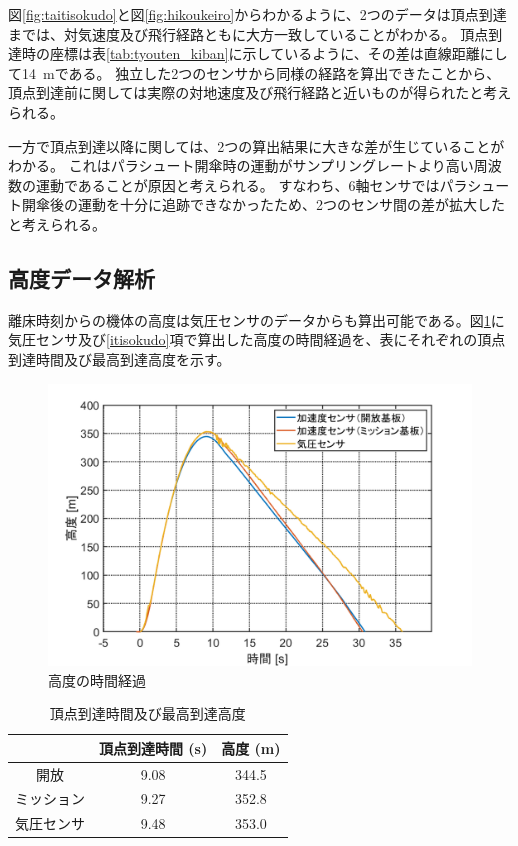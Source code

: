 \documentclass[a4paper,11pt,uplatex]{jsarticle}
\begin{document}
図\ref{fig:taitisokudo}と図\ref{fig:hikoukeiro}からわかるように、2つのデータは頂点到達までは、対気速度及び飛行経路ともに大方一致していることがわかる。
頂点到達時の座標は表\ref{tab:tyouten_kiban}に示しているように、その差は直線距離にして\SI{14}{m}である。
独立した2つのセンサから同様の経路を算出できたことから、頂点到達前に関しては実際の対地速度及び飛行経路と近いものが得られたと考えられる。

一方で頂点到達以降に関しては、2つの算出結果に大きな差が生じていることがわかる。
これはパラシュート開傘時の運動がサンプリングレートより高い周波数の運動であることが原因と考えられる。
すなわち、6軸センサではパラシュート開傘後の運動を十分に追跡できなかったため、2つのセンサ間の差が拡大したと考えられる。

\subsection{高度データ解析}
\label{koudo}
離床時刻からの機体の高度は気圧センサのデータからも算出可能である。図\ref{fig:koudozikannkeika}に気圧センサ及び\ref{itisokudo}項で算出した高度の時間経過を、表にそれぞれの頂点到達時間及び最高到達高度を示す。

\begin{figure}[H]
	\centering
	\includegraphics[width=0.7\linewidth]{pic_sim/pos_h.png}
	\caption{高度の時間経過}
	\label{fig:koudozikannkeika}
\end{figure}

\begin{table}[H]
	\centering
	\caption{頂点到達時間及び最高到達高度}
	\label{tab:tyouten}
	\begin{tabular}{ccc}
		\hline
		      & 頂点到達時間 (\si{s}) & 高度 (\si{m}) \\\hline
		開放    & 9.08            & 344.5       \\
		ミッション & 9.27            & 352.8       \\
		気圧センサ & 9.48            & 353.0       \\
		\hline
	\end{tabular}
\end{table}
\end{document}
